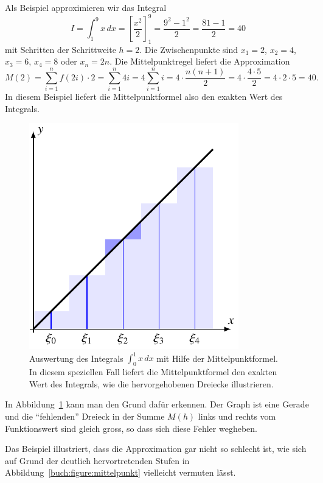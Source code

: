 \begin{beispiel}
\label{buch:beispiel:kreis}
Als Beispiel approximieren wir das Integral
\[
I
=
\int_{1}^{9} x\,dx
=
\left[\frac{x^2}2\right]_1^9
=
\frac{9^2-1^2}2=\frac{81-1}2=40
\]
mit Schritten der Schrittweite $h=2$.
Die Zwischenpunkte sind $x_1=2$, $x_2=4$, $x_3=6$, $x_4=8$ oder $x_n=2n$.
Die Mittelpunktregel liefert die Approximation
\[
M(2)
=
\sum_{i=1}^n f(2i) \cdot 2
=
\sum_{i=1}^n 4i
=
4\sum_{i=1}^n i
=
4\cdot \frac{n(n+1)}{2}
=
4\cdot\frac{4\cdot 5}{2}
=
4\cdot 2 \cdot 5
=
40.
\]
In diesem Beispiel liefert die Mittelpunktformel also den exakten Wert
des Integrals.
\begin{figure}
\centering
\includegraphics{chapters/40-integration/figures/dreiecke.pdf}
\caption{Auswertung des Integrals $\int_0^1 x\,dx$ mit Hilfe der
Mittelpunktformel.
In diesem speziellen Fall liefert die Mittelpunktformel den exakten
Wert des Integrals, wie die hervorgehobenen Dreiecke illustrieren.
\label{buch:figure:dreiecke}}
\end{figure}
In Abbildung~\ref{buch:figure:dreiecke} kann man den Grund dafür
erkennen.
Der Graph ist eine Gerade und die 
``fehlenden'' Dreieck in der Summe $M(h)$ links und rechts vom
Funktionswert sind gleich gross, so dass sich diese Fehler wegheben.
\end{beispiel}
Das Beispiel illustriert, dass die Approximation gar nicht so schlecht ist,
wie sich auf Grund der deutlich hervortretenden Stufen in
Abbildung~\ref{buch:figure:mittelpunkt} vielleicht vermuten lässt.
%
%

